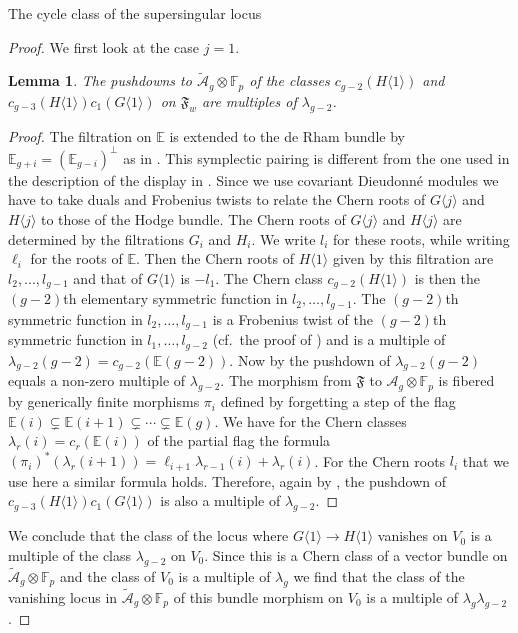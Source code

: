 \documentclass[11pt]{amsart}
\numberwithin{equation}{section}
\newcommand{\EE}{\mathbb E}
\newcommand{\FF}{\mathbb F}
\newtheorem{lemma}[theorem]{Lemma}
\theoremstyle{definition}
\theoremstyle{remark}
\begin{document}
\begin{section}{The cycle class of the supersingular locus}
\begin{proof}
We first look at the case $j=1$.
\begin{lemma}\label{pushdown}
The pushdowns 
to $\tilde{\mathcal{A}}_g\otimes {\FF}_p$ of the classes 
$c_{g-2}(H\langle 1\rangle)$ and
$c_{g-3}(H\langle 1 \rangle) c_1(G\langle 1\rangle)$ 
on $\mathfrak{F}_{w}$
are multiples of $\lambda_{g-2}$.
\end{lemma}
\begin{proof}
The filtration on ${\EE}$ is extended to the de Rham bundle by 
${\EE}_{g+i}=({\EE}_{g-i})^{\bot}$ as in \cite[Section 3]{E-vdG}.
This symplectic pairing is different from the one used in the description of
the display in \cite{Oort-AM152}.
Since we use covariant Dieudonn\'e modules we have to take duals and Frobenius twists
to relate the Chern roots of $G\langle j\rangle$ and $H\langle j \rangle$ to those
of the Hodge bundle. 
The Chern roots of $G\langle j\rangle$ and $H\langle j \rangle$ 
are determined by the filtrations $G_i$ and $H_i$. We write $l_i$ for these roots,
while writing $\ell_i$ for the roots of ${\EE}$.
Then the Chern roots of  $H\langle 1 \rangle $ given by this filtration
are $l_{2},...,l_{g-1}$ and that of $G\langle 1\rangle$ is $-l_1$.
The Chern class $c_{g-2}(H\langle 1 \rangle)$ 
 is then the $(g-2)$th elementary symmetric function in $l_2,\ldots,l_{g-1}$. 
The $(g-2)$th symmetric function in $l_2,\ldots, l_{g-1}$ is a Frobenius twist
of the $(g-2)$th symmetric function in $l_1,\ldots, l_{g-2}$ (cf.\
the proof of \cite[Lemma 12.3]{E-vdG}) and 
is a multiple of $\lambda_{g-2}(g-2)=c_{g-2}({\EE}(g-2))$. Now by 
\cite[Lemma 12.3]{E-vdG} the pushdown of 
$\lambda_{g-2}(g-2)$ equals a non-zero multiple
of $\lambda_{g-2}$. The morphism from $\mathfrak{F}$ to $\mathcal{A}_g \otimes {\FF}_p$
is fibered by generically finite morphisms $\pi_i$ 
defined by forgetting a step of the flag ${\EE}(i)\subsetneq \EE(i+1)\subsetneq 
\cdots \subsetneq {\EE}(g)$. 
We have for the Chern classes
$\lambda_r(i)=c_r({\EE}(i))$ of the partial flag
the formula
$(\pi_i)^{*}(\lambda_r(i+1))=\ell_{i+1}\lambda_{r-1}(i)+\lambda_r(i)$.
For the Chern roots $l_i$ that we use here a similar formula holds.
Therefore, again by \cite[Lemma 12.3]{E-vdG}, 
the pushdown of $c_{g-3}(H\langle 1 \rangle) c_1(G\langle 1\rangle)$ is also a multiple of $\lambda_{g-2}$.
\end{proof}
We conclude that the class of the 
locus where $G\langle 1 \rangle \to H\langle 1 \rangle$ 
vanishes on $V_0$ is a multiple of the class $\lambda_{g-2}$ on $V_0$.
Since this is a Chern class of a vector bundle on $\tilde{\mathcal{A}}_g \otimes {\FF}_p$ and the class of $V_0$ is a multiple of $\lambda_g$ we find
that the class of the vanishing locus in 
$\tilde{\mathcal{A}}_g \otimes {\FF}_p$
of this bundle morphism on $V_0$ is a multiple 
of $\lambda_g\lambda_{g-2}$.


\end{proof}
\end{section}
\end{document}
